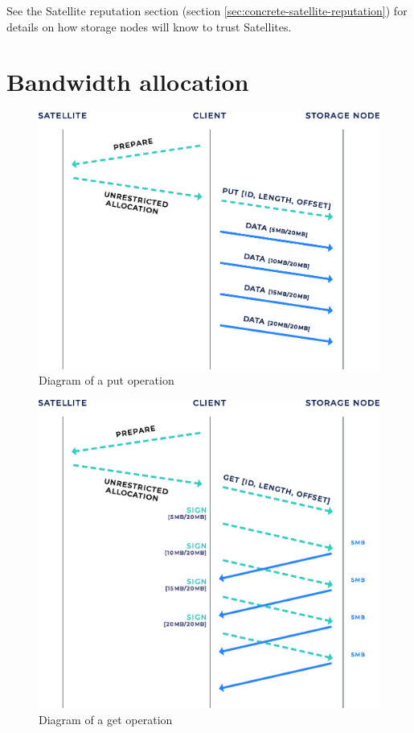 \documentclass[8pt,fleqn,openany]{book}
\begin{document}
See the Satellite reputation section
(section \ref{sec:concrete-satellite-reputation}) for details on
how storage nodes will know to trust Satellites.

\section{Bandwidth allocation}\label{baer}

\begin{figure}[!htbp]
\centering
\includegraphics[height=.4\textheight]{images/put.eps}
\caption{Diagram of a put operation}
\label{fig:bap-put}
\end{figure}

\begin{figure}[!htbp]
\centering
\includegraphics[height=.4\textheight]{images/get.eps}
\caption{Diagram of a get operation}
\label{fig:bap-get}
\end{figure}
\end{document}
